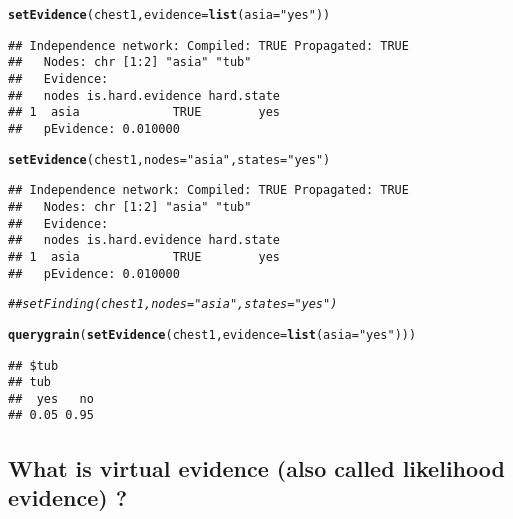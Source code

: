 \documentclass[10pt]{article}\usepackage[]{graphicx}\usepackage[]{color}
\makeatletter
\newcommand{\hlstr}[1]{\textcolor[rgb]{0.192,0.494,0.8}{#1}}%
\newcommand{\hlcom}[1]{\textcolor[rgb]{0.678,0.584,0.686}{\textit{#1}}}%
\newcommand{\hlstd}[1]{\textcolor[rgb]{0.345,0.345,0.345}{#1}}%
\newcommand{\hlkwc}[1]{\textcolor[rgb]{0.333,0.667,0.333}{#1}}%
\newcommand{\hlkwd}[1]{\textcolor[rgb]{0.737,0.353,0.396}{\textbf{#1}}}%
\newenvironment{kframe}{%
 \def\at@end@of@kframe{}%
 \ifinner\ifhmode%
  \def\at@end@of@kframe{\end{minipage}}%
  \begin{minipage}{\columnwidth}%
 \fi\fi%
 \def\FrameCommand##1{\hskip\@totalleftmargin \hskip-\fboxsep
 \colorbox{shadecolor}{##1}\hskip-\fboxsep
     \hskip-\linewidth \hskip-\@totalleftmargin \hskip\columnwidth}%
 \MakeFramed {\advance\hsize-\width
   \@totalleftmargin\z@ \linewidth\hsize
   \@setminipage}}%
 {\par\unskip\endMakeFramed%
 \at@end@of@kframe}
\newenvironment{knitrout}{}{} %
\makeatother
\begin{document}
\begin{knitrout}
\color{fgcolor}\begin{kframe}
\begin{alltt}
\hlkwd{setEvidence}\hlstd{(chest1,} \hlkwc{evidence}\hlstd{=}\hlkwd{list}\hlstd{(}\hlkwc{asia}\hlstd{=}\hlstr{"yes"}\hlstd{))}
\end{alltt}
\begin{verbatim}
## Independence network: Compiled: TRUE Propagated: TRUE 
##   Nodes: chr [1:2] "asia" "tub"
##   Evidence:
##   nodes is.hard.evidence hard.state
## 1  asia             TRUE        yes
##   pEvidence: 0.010000
\end{verbatim}
\begin{alltt}
\hlkwd{setEvidence}\hlstd{(chest1,} \hlkwc{nodes}\hlstd{=}\hlstr{"asia"}\hlstd{,} \hlkwc{states}\hlstd{=}\hlstr{"yes"}\hlstd{)}
\end{alltt}
\begin{verbatim}
## Independence network: Compiled: TRUE Propagated: TRUE 
##   Nodes: chr [1:2] "asia" "tub"
##   Evidence:
##   nodes is.hard.evidence hard.state
## 1  asia             TRUE        yes
##   pEvidence: 0.010000
\end{verbatim}
\begin{alltt}
\hlcom{## setFinding(chest1, nodes="asia", states="yes")}
\end{alltt}
\end{kframe}
\end{knitrout}

\begin{knitrout}
\color{fgcolor}\begin{kframe}
\begin{alltt}
\hlkwd{querygrain}\hlstd{(}\hlkwd{setEvidence}\hlstd{(chest1,} \hlkwc{evidence}\hlstd{=}\hlkwd{list}\hlstd{(}\hlkwc{asia}\hlstd{=}\hlstr{"yes"}\hlstd{)))}
\end{alltt}
\begin{verbatim}
## $tub
## tub
##  yes   no 
## 0.05 0.95
\end{verbatim}
\end{kframe}
\end{knitrout}

\subsection{What is virtual evidence (also called likelihood evidence)
?}
\label{sec:virt-evid-likel}
\end{document}
